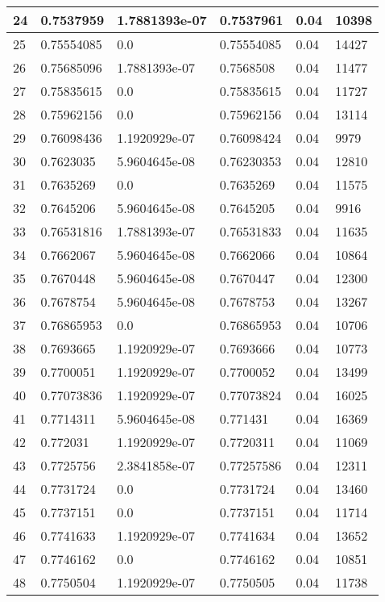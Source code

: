 \begin{longtable}{|l|l|l|l|l|l|}
24 & 0.7537959 & 1.7881393e-07 & 0.7537961 & 0.04 & 10398 \\ \hline 
25 & 0.75554085 & 0.0 & 0.75554085 & 0.04 & 14427 \\ \hline 
26 & 0.75685096 & 1.7881393e-07 & 0.7568508 & 0.04 & 11477 \\ \hline 
27 & 0.75835615 & 0.0 & 0.75835615 & 0.04 & 11727 \\ \hline 
28 & 0.75962156 & 0.0 & 0.75962156 & 0.04 & 13114 \\ \hline 
29 & 0.76098436 & 1.1920929e-07 & 0.76098424 & 0.04 & 9979 \\ \hline 
30 & 0.7623035 & 5.9604645e-08 & 0.76230353 & 0.04 & 12810 \\ \hline 
31 & 0.7635269 & 0.0 & 0.7635269 & 0.04 & 11575 \\ \hline 
32 & 0.7645206 & 5.9604645e-08 & 0.7645205 & 0.04 & 9916 \\ \hline 
33 & 0.76531816 & 1.7881393e-07 & 0.76531833 & 0.04 & 11635 \\ \hline 
34 & 0.7662067 & 5.9604645e-08 & 0.7662066 & 0.04 & 10864 \\ \hline 
35 & 0.7670448 & 5.9604645e-08 & 0.7670447 & 0.04 & 12300 \\ \hline 
36 & 0.7678754 & 5.9604645e-08 & 0.7678753 & 0.04 & 13267 \\ \hline 
37 & 0.76865953 & 0.0 & 0.76865953 & 0.04 & 10706 \\ \hline 
38 & 0.7693665 & 1.1920929e-07 & 0.7693666 & 0.04 & 10773 \\ \hline 
39 & 0.7700051 & 1.1920929e-07 & 0.7700052 & 0.04 & 13499 \\ \hline 
40 & 0.77073836 & 1.1920929e-07 & 0.77073824 & 0.04 & 16025 \\ \hline 
41 & 0.7714311 & 5.9604645e-08 & 0.771431 & 0.04 & 16369 \\ \hline 
42 & 0.772031 & 1.1920929e-07 & 0.7720311 & 0.04 & 11069 \\ \hline 
43 & 0.7725756 & 2.3841858e-07 & 0.77257586 & 0.04 & 12311 \\ \hline 
44 & 0.7731724 & 0.0 & 0.7731724 & 0.04 & 13460 \\ \hline 
45 & 0.7737151 & 0.0 & 0.7737151 & 0.04 & 11714 \\ \hline 
46 & 0.7741633 & 1.1920929e-07 & 0.7741634 & 0.04 & 13652 \\ \hline 
47 & 0.7746162 & 0.0 & 0.7746162 & 0.04 & 10851 \\ \hline 
48 & 0.7750504 & 1.1920929e-07 & 0.7750505 & 0.04 & 11738 \\ \hline 

\end{longtable}
